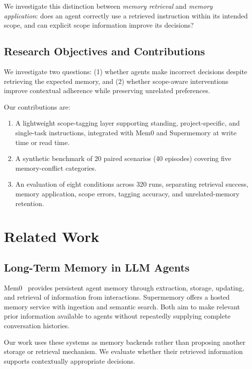 \documentclass[11pt,a4paper]{article}
\begin{document}
We investigate this distinction between \emph{memory retrieval}
and \emph{memory application}: does an agent correctly use a
retrieved instruction within its intended scope, and can explicit
scope information improve its decisions?

\subsection{Research Objectives and Contributions}

We investigate two questions: (1) whether agents make incorrect
decisions despite retrieving the expected memory, and (2) whether
scope-aware interventions improve contextual adherence while
preserving unrelated preferences.

Our contributions are:
\begin{enumerate}
    \item A lightweight scope-tagging layer supporting standing,
    project-specific, and single-task instructions, integrated
    with Mem0 and Supermemory at write time or read time.
    \item A synthetic benchmark of 20 paired scenarios (40
    episodes) covering five memory-conflict categories.
    \item An evaluation of eight conditions across 320 runs,
    separating retrieval success, memory application, scope
    errors, tagging accuracy, and unrelated-memory retention.
\end{enumerate}

\section{Related Work}

\subsection{Long-Term Memory in LLM Agents}

Mem0~\cite{chhikara2025mem0} provides persistent agent memory
through extraction, storage, updating, and retrieval of
information from interactions. Supermemory
\cite{supermemoryresearch} offers a hosted memory service with
ingestion and semantic search. Both aim to make relevant prior
information available to agents without repeatedly supplying
complete conversation histories.

Our work uses these systems as memory backends rather than
proposing another storage or retrieval mechanism. We evaluate
whether their retrieved information supports contextually
appropriate decisions.
\end{document}
